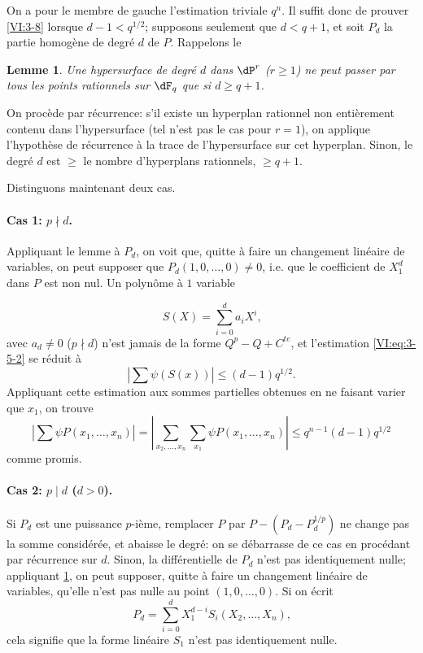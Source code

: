 \documentclass[oneside]{book}
\theoremstyle{sga-source}
\theoremstyle{sga-source-dash}
\theoremstyle{sga-source-dotdash}
\theoremstyle{sga-source-number-note-dash}
\theoremstyle{sga-source-note-number-dotdash}
\theoremstyle{sga-source-example-dotdash}
\theoremstyle{sga-source-inline-number}
\theoremstyle{sga-source-bare-number}
\theoremstyle{sga-source}
\newtheorem{lemma_}[subsection]{Lemme}
\newcommand{\PrintPage}[1]{}\newcommand{\MathPage}[1]{}\newcommand{\PrintCite}[2]{#1}\newcommand{\var}[3]{#2}
\begin{document}
On a pour le membre de gauche l'estimation triviale $q^n$. Il suffit donc de 
prouver \ref{VI:3-8} lorsque $d-1<q^{1/2}$; supposons seulement que 
$d<q+1$, et soit $P_d$ la partie homogène de degré $d$ de $P$. Rappelons le 





\begin{lemma_}\label{VI:3-9}
Une hypersurface de degré $d$ dans $\dP^r$ (\var{$r\geqslant i$}{$r\geqslant 1$}{S45-SOL-0786}) ne peut passer 
\var{par tout les points}{par tous les points}{S45-SOL-0787} rationnels sur $\dF_q$ que si $d\geqslant q+1$. 
\end{lemma_}

On procède par récurrence: s'il existe un hyperplan rationnel non 
entièrement contenu dans l'hypersurface (tel n'est pas le cas pour $r=1$), on 
applique l'hypothèse de récurrence à la trace de l'hypersurface sur cet 
hyperplan. Sinon, le degré $d$ est $\geqslant$ le nombre d'\var{hyperplans rationnel}{hyperplans rationnels}{S45-SOL-0789}, $\geqslant q+1$. 

Distinguons maintenant deux cas. 


\paragraph{Cas 1: $p\nmid d$.}
Appliquant le lemme à $P_d$, on voit que, quitte à faire un changement 
linéaire de variables, on peut supposer que $P_d(1,0,\ldots,0)\ne 0$, i.e. 
que le coefficient de $X_1^d$ dans $P$ est non nul. Un polynôme à $1$ 
variable 
\PrintPage{194}
\[
  S(X) = \sum_{i=0}^d a_i X^i \text{,} 
\]
avec $a_d\ne 0$ ($p\nmid d$) n'est jamais de la forme $Q^p-Q+C^{t e}$, et 
l'estimation \eqref{VI:eq:3-5-2} se réduit à 
\[
  \left| \sum \psi(S(x)) \right| \leqslant (d-1) q^{1/2} \text{.} 
\]
Appliquant cette estimation aux sommes partielles obtenues en ne faisant varier 
que $x_1$, on trouve 
\[
  \left| \sum \psi P(x_1,\dots,x_n) \right| = \left| \var{\sum_{x_2,\dots,x_n} \sum_{x_1} \psi P(x_1,\dots,x_n\right|}{\sum_{x_2,\dots,x_n} \sum_{x_1} \psi P(x_1,\dots,x_n)\right|}{S45-SOL-0792} \leqslant q^{n-1} (d-1) q^{1/2} 
\]
comme promis. 


\paragraph{Cas 2: $p\mid d$ ($d>0$).}
Si $P_d$ est une puissance $p$-ième, remplacer $P$ par $P-(P_d-P_d^{1/p})$ ne 
change pas la somme considérée, et abaisse le degré: on se débarrasse de 
ce cas en procédant par récurrence sur $d$. Sinon, la différentielle de 
$P_d$ n'est pas identiquement nulle; appliquant \ref{VI:3-9}, on peut supposer, 
quitte à faire un changement linéaire de variables, qu'elle n'est pas nulle 
au point $(1,0,\dots,0)$. Si on écrit 
\[
  P_d = \sum_{i=0}^d X_1^{d-i} S_i(X_2,\dots,X_n) \text{,} 
\]
cela signifie que la forme linéaire $S_1$ n'est pas identiquement nulle. 
\end{document}
